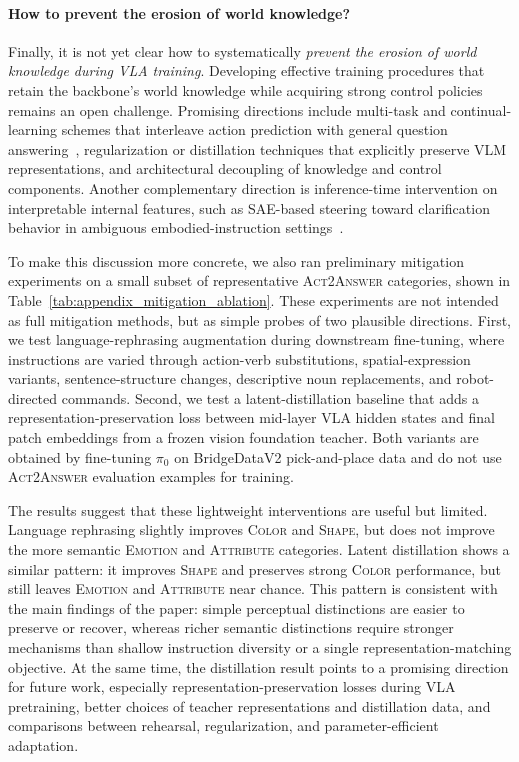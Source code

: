 \documentclass[11pt]{article}
\begin{document}
\paragraph{How to prevent the erosion of world knowledge?}
Finally, it is not yet clear how to systematically \emph{prevent the erosion of world knowledge during VLA training}. 
Developing effective training procedures that retain the backbone’s world knowledge while acquiring strong control policies remains an open challenge.
Promising directions include multi-task and continual-learning schemes that interleave action prediction with general question answering~\cite{zitkovich2023rt, amin2025pi, ivanova-etal-2025-ambik}, regularization or distillation techniques that explicitly preserve VLM representations, and architectural decoupling of knowledge and control components. Another complementary direction is inference-time intervention on interpretable internal features, such as SAE-based steering toward clarification behavior in ambiguous embodied-instruction settings~\citep{petrova2026steering}.

To make this discussion more concrete, we also ran preliminary mitigation experiments on a small subset of representative \textsc{Act2Answer} categories, shown in Table~\ref{tab:appendix_mitigation_ablation}.
These experiments are not intended as full mitigation methods, but as simple probes of two plausible directions.
First, we test language-rephrasing augmentation during downstream fine-tuning, where instructions are varied through action-verb substitutions, spatial-expression variants, sentence-structure changes, descriptive noun replacements, and robot-directed commands.
Second, we test a latent-distillation baseline that adds a representation-preservation loss between mid-layer VLA hidden states and final patch embeddings from a frozen vision foundation teacher.
Both variants are obtained by fine-tuning $\pi_0$ on BridgeDataV2 pick-and-place data and do not use \textsc{Act2Answer} evaluation examples for training.

The results suggest that these lightweight interventions are useful but limited.
Language rephrasing slightly improves \textsc{Color} and \textsc{Shape}, but does not improve the more semantic \textsc{Emotion} and \textsc{Attribute} categories.
Latent distillation shows a similar pattern: it improves \textsc{Shape} and preserves strong \textsc{Color} performance, but still leaves \textsc{Emotion} and \textsc{Attribute} near chance.
This pattern is consistent with the main findings of the paper: simple perceptual distinctions are easier to preserve or recover, whereas richer semantic distinctions require stronger mechanisms than shallow instruction diversity or a single representation-matching objective.
At the same time, the distillation result points to a promising direction for future work, especially representation-preservation losses during VLA pretraining, better choices of teacher representations and distillation data, and comparisons between rehearsal, regularization, and parameter-efficient adaptation.
\end{document}
